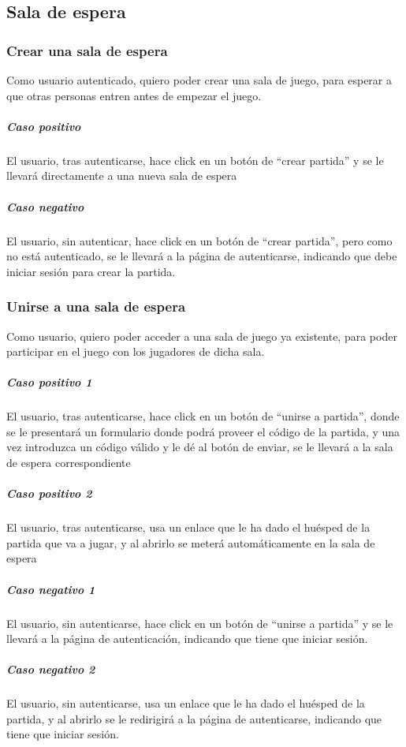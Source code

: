 \subsection{Sala de espera}

\subsubsection{Crear una sala de espera }

Como usuario autenticado, quiero poder crear una sala de juego, para esperar a que otras personas entren antes de empezar el juego. 

\subparagraph{Caso positivo}

El usuario, tras autenticarse, hace click en un botón de “crear partida” y se le llevará directamente a una nueva sala de espera 

\subparagraph{Caso negativo }

El usuario, sin autenticar, hace click en un botón de “crear partida”, pero como no está autenticado, se le llevará a la página de autenticarse, indicando que debe iniciar sesión para crear la partida. 

\subsubsection{Unirse a una sala de espera }

Como usuario, quiero poder acceder a una sala de juego ya existente, para poder participar en el juego con los jugadores de dicha sala. 

\subparagraph{Caso positivo 1}

El usuario, tras autenticarse, hace click en un botón de “unirse a partida”, donde se le presentará un formulario donde podrá proveer el código de la partida, y una vez introduzca un código válido y le dé al botón de enviar, se le llevará a la sala de espera correspondiente 

\subparagraph{Caso positivo 2}

El usuario, tras autenticarse, usa un enlace que le ha dado el huésped de la partida que va a jugar, y al abrirlo se meterá automáticamente en la sala de espera 

\subparagraph{Caso negativo 1}

El usuario, sin autenticarse, hace click en un botón de “unirse a partida” y se le llevará a la página de autenticación, indicando que tiene que iniciar sesión. 

\subparagraph{Caso negativo 2}
El usuario, sin autenticarse, usa un enlace que le ha dado el huésped de la partida, y al abrirlo se le redirigirá a la página de autenticarse, indicando que tiene que iniciar sesión. 

